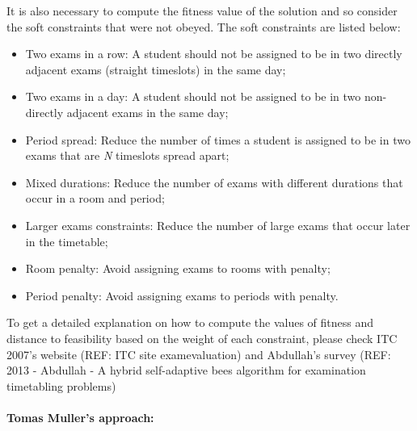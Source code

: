 It is also necessary to compute the fitness value of the solution and so consider the soft constraints that were not obeyed. The soft constraints are listed below:
\begin{itemize}
	\item Two exams in a row: A student should not be assigned to be in two directly adjacent exams (straight timeslots) in the same day;
	\item Two exams in a day: A student should not be assigned to be in two non-directly adjacent exams in the same day;
	\item Period spread: Reduce the number of times a student is assigned to be in two exams that are \textit{N} timeslots spread apart;
	\item Mixed durations: Reduce the number of exams with different durations that occur in a room and period;
	\item Larger exams constraints: Reduce the number of large exams that occur later in the timetable;
	\item Room penalty: Avoid assigning exams to rooms with penalty;
	\item Period penalty: Avoid assigning exams to periods with penalty.
\end{itemize}

To get a detailed explanation on how to compute the values of fitness and distance to feasibility based on the weight of each constraint, please check ITC 2007's website (REF: ITC site examevaluation) and Abdullah's survey (REF: 2013 - Abdullah - A hybrid self-adaptive bees algorithm for examination timetabling problems)


\paragraph{\textbf{Tomas Muller's approach:}}

